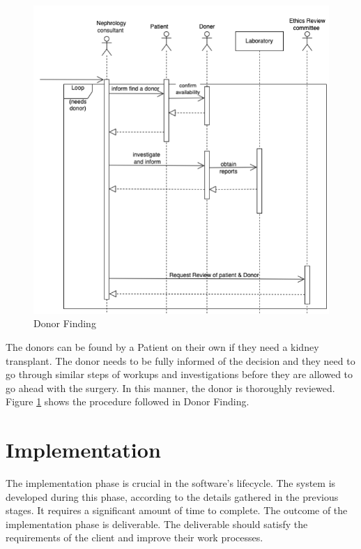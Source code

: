 \documentclass[12pt,a4paper]{report}
\begin{document}
 \begin{figure}[hbp]
\begin{center}
\includegraphics[width=\textwidth]{images/donor-finding.png}	
\end{center}
\caption{Donor Finding}
\label{fig:donor-finding}
\end{figure}
The donors can be found by a Patient on their own if they need a kidney transplant. The donor needs to be fully informed of the decision and they need to go through similar steps of workups and investigations before they are allowed to go ahead with the surgery. In this manner, the donor is thoroughly reviewed. Figure \ref{fig:donor-finding} shows the procedure followed in Donor Finding. 

\chapter{Implementation}
The implementation phase is crucial in the software's lifecycle. The system is developed during this phase, according to the details gathered in the previous stages. It requires a significant amount of time to complete. The outcome of the implementation phase is deliverable. The deliverable should satisfy the requirements of the client and improve their work processes.
\end{document}
